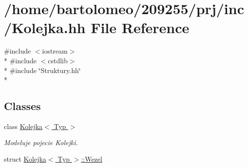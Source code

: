 \hypertarget{_kolejka_8hh}{\section{/home/bartolomeo/209255/prj/inc/\-Kolejka.hh File Reference}
\label{_kolejka_8hh}
}
{\ttfamily \#include $<$iostream$>$}\\*
{\ttfamily \#include $<$cstdlib$>$}\\*
{\ttfamily \#include \char`\"{}Struktury.\-hh\char`\"{}}\\*
\subsection*{Classes}
\begin{DoxyCompactItemize}
\item 
class \hyperlink{class_kolejka}{Kolejka$<$ Typ $>$}
\begin{DoxyCompactList}\small\item\em Modeluje pojecie Kolejki. \end{DoxyCompactList}\item 
struct \hyperlink{struct_kolejka_1_1_wezel}{Kolejka$<$ Typ $>$\-::\-Wezel}
\end{DoxyCompactItemize}
